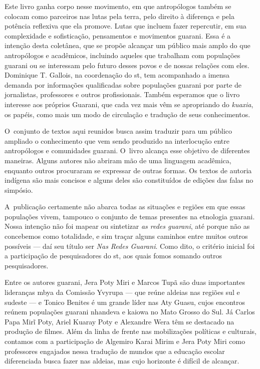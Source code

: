Este livro ganha corpo nesse movimento, em que antropólogos também se
colocam como parceiros nas lutas pela terra, pelo direito à diferença e
pela potência reflexiva que ela promove. Lutas que incluem fazer
repercutir, em sua complexidade e sofisticação, pensamentos e
movimentos guarani. Essa é a intenção desta coletânea, que se propõe
alcançar um público mais amplo do que antropólogos e acadêmicos,
incluindo aqueles que trabalham com populações guarani ou se interessam
pelo futuro desses povos e de nossas relações com eles. Dominique T.
Gallois, na coordenação do st, tem acompanhado a imensa demanda por
informações qualificadas sobre populações guarani por
parte de jornalistas, professores e outros profissionais. Também esperamos que
o livro interesse aos próprios Guarani, que cada vez mais vêm se
apropriando do \emph{kuaxia}, os papéis, como mais um modo de circulação e
tradução de seus conhecimentos.

O~conjunto de textos aqui reunidos busca assim traduzir para um público
ampliado o conhecimento que vem sendo produzido na interlocução entre
antropólogos e comunidades guarani. O~livro alcança esse objetivo de
diferentes maneiras. Alguns autores não abriram mão de uma linguagem
acadêmica, enquanto outros procuraram se expressar de outras formas. Os
textos de autoria indígena são mais concisos e alguns deles são constituídos de
edições das falas no simpósio. 

A~publicação certamente não abarca todas as situações e regiões em que
essas populações vivem, tampouco o conjunto de temas presentes na
etnologia guarani. Nossa intenção não foi mapear ou sintetizar \emph{as redes
guarani}, até porque não as concebemos como totalidade, e sim traçar
alguns caminhos entre muitos outros possíveis --- daí seu título ser \emph{Nas
Redes Guarani}. Como dito, o critério inicial foi a participação de
pesquisadores do st, aos quais fomos somando outros pesquisadores. 

Entre os autores guarani, Jera Poty Miri e Marcos Tupã são duas
importantes lideranças mbya da Comissão Yvyrupa --- que reúne aldeias nas
regiões sul e sudeste --- e Tonico Benites é um grande líder nas Aty
Guasu, cujos encontros reúnem populações guarani nhandeva e kaiowa no
Mato Grosso do Sul. Já Carlos Papa Mirĩ Poty, Ariel Kuaray Poty e
Alexandre Wera têm se destacado na produção de filmes. Além da linha de
frente nas mobilizações políticas e culturais, contamos com a
participação de Algemiro Karai Mirim e Jera Poty Miri como professores
engajados nessa tradução de mundos que a educação escolar diferenciada
busca fazer nas aldeias, mas cujo horizonte é difícil de alcançar.

